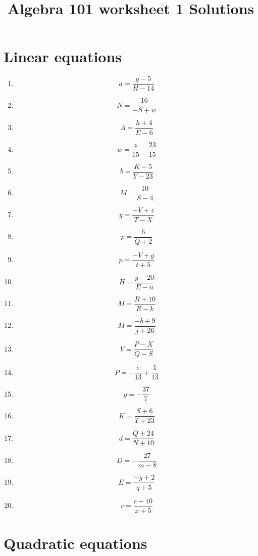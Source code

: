 \documentclass{article}
\begin{document}
    \title{Algebra 101 worksheet 1 Solutions} 
 \date{\vspace{-5ex}} 
 \maketitle

        \section{Linear equations}
        
        \begin{enumerate}
        \item$$a =\frac{g - 5}{H - 14}$$
\item$$N =\frac{16}{- S + w}$$
\item$$A =\frac{h + 4}{E - 6}$$
\item$$w =\frac{z}{15} - \frac{23}{15}$$
\item$$b =\frac{K - 5}{Y - 23}$$
\item$$M =\frac{10}{S - 4}$$
\item$$y =\frac{- V + z}{T - X}$$
\item$$p =\frac{6}{Q + 2}$$
\item$$p =\frac{- V + g}{t + 5}$$
\item$$H =\frac{y - 20}{E - u}$$
\item$$M =\frac{R + 10}{R - k}$$
\item$$M =\frac{- b + 9}{j + 26}$$
\item$$V =\frac{P - X}{Q - S}$$
\item$$P =- \frac{e}{13} + \frac{1}{13}$$
\item$$g =- \frac{37}{7}$$
\item$$K =\frac{S + 6}{T + 23}$$
\item$$d =\frac{Q + 24}{N + 10}$$
\item$$D =- \frac{27}{m - 8}$$
\item$$E =\frac{- y + 2}{q + 5}$$
\item$$r =\frac{c - 10}{x + 5}$$
        \end{enumerate}
        

        \section{Quadratic equations}
        
\end{document}
